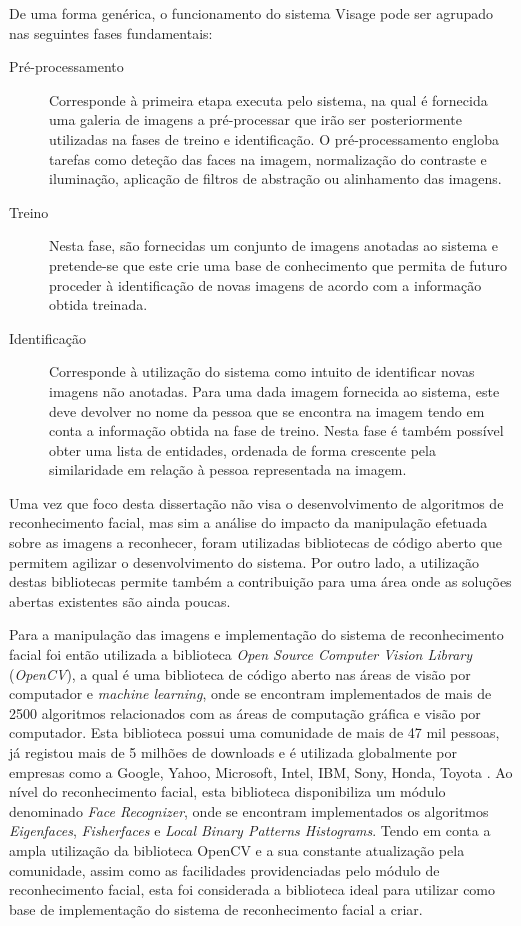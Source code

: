De uma forma genérica, o funcionamento do sistema Visage pode ser agrupado nas seguintes fases fundamentais:
\begin{description}
\item[Pré-processamento] Corresponde à primeira etapa executa pelo sistema, na qual é fornecida uma galeria de imagens a pré-processar que irão ser posteriormente utilizadas na fases de treino e identificação. O pré-processamento engloba tarefas como deteção das faces na imagem, normalização do contraste e iluminação, aplicação de filtros de abstração ou alinhamento das imagens.
\item[Treino] Nesta fase, são fornecidas um conjunto de imagens anotadas ao sistema e pretende-se que este crie uma base de conhecimento que permita de futuro proceder à identificação de novas imagens de acordo com a informação obtida treinada.
\item[Identificação] Corresponde à utilização do sistema como intuito de identificar novas imagens não anotadas. Para uma dada imagem fornecida ao sistema, este deve devolver no nome da pessoa que se encontra na imagem tendo em conta a informação obtida na fase de treino. Nesta fase é também possível obter uma lista de entidades, ordenada de forma crescente pela similaridade em relação à pessoa representada na imagem.
\end{description}

Uma vez que foco desta dissertação não visa o desenvolvimento de algoritmos de reconhecimento facial, mas sim a análise do impacto da manipulação efetuada sobre as imagens a reconhecer, foram utilizadas bibliotecas de código aberto que permitem agilizar o desenvolvimento do sistema. Por outro lado, a utilização destas bibliotecas permite também a contribuição para uma área onde as soluções abertas existentes são ainda poucas.

Para a manipulação das imagens e implementação do sistema de reconhecimento facial foi então utilizada a biblioteca \textit{Open Source Computer Vision Library} (\textit{OpenCV}), a qual é uma biblioteca de código aberto nas áreas de visão por computador e \textit{machine learning}, onde se encontram implementados de mais de 2500 algoritmos relacionados com as áreas de computação gráfica e visão por computador. Esta biblioteca possui uma comunidade de mais de 47 mil pessoas, já registou mais de 5 milhões de downloads e é utilizada globalmente por empresas como a Google, Yahoo, Microsoft, Intel, IBM, Sony, Honda, Toyota \cite{Team}. Ao nível do reconhecimento facial, esta biblioteca disponibiliza um módulo denominado \textit{Face Recognizer}, onde se encontram implementados os algoritmos \textit{Eigenfaces}, \textit{Fisherfaces} e \textit{Local Binary Patterns Histograms}. Tendo em conta a ampla utilização da biblioteca OpenCV e a sua constante atualização pela comunidade, assim como as facilidades providenciadas pelo módulo de reconhecimento facial, esta foi considerada a biblioteca ideal para utilizar como base de implementação do sistema de reconhecimento facial a criar.

